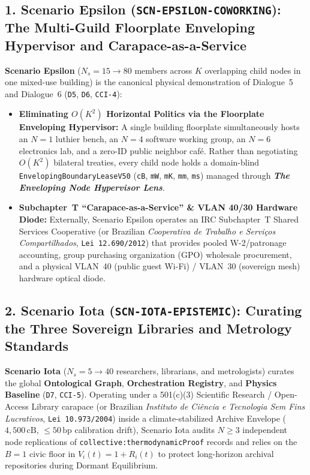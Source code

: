 \subsection{1. Scenario Epsilon (\texttt{SCN-EPSILON-COWORKING}): The Multi-Guild Floorplate Enveloping Hypervisor and Carapace-as-a-Service}
\textbf{Scenario Epsilon} ($N_s = 15 \to 80$ members across $K$ overlapping child nodes in one mixed-use building) is the canonical physical demonstration of Dialogue~5 and Dialogue~6 (\texttt{D5}, \texttt{D6}, \texttt{CCI-4}):
\begin{itemize}
    \item \textbf{Eliminating $O(K^2)$ Horizontal Politics via the Floorplate Enveloping Hypervisor:} A single building floorplate simultaneously hosts an $N=1$ luthier bench, an $N=4$ software working group, an $N=6$ electronics lab, and a zero-ID public neighbor café. Rather than negotiating $O(K^2)$ bilateral treaties, every child node holds a domain-blind \texttt{EnvelopingBoundaryLeaseV50} (\texttt{cB}, \texttt{mW}, \texttt{mK}, \texttt{mm}, \texttt{ms}) managed through \textbf{\textit{The Enveloping Node Hypervisor Lens}}.
    \item \textbf{Subchapter~T ``Carapace-as-a-Service'' \& VLAN 40/30 Hardware Diode:} Externally, Scenario Epsilon operates an IRC Subchapter~T Shared Services Cooperative (or Brazilian \textit{Cooperativa de Trabalho e Serviços Compartilhados}, \texttt{Lei 12.690/2012}) that provides pooled W-2/patronage accounting, group purchasing organization (GPO) wholesale procurement, and a physical VLAN~40 (public guest Wi-Fi) / VLAN~30 (sovereign mesh) hardware optical diode.
\end{itemize}

\subsection{2. Scenario Iota (\texttt{SCN-IOTA-EPISTEMIC}): Curating the Three Sovereign Libraries and Metrology Standards}
\textbf{Scenario Iota} ($N_s = 5 \to 40$ researchers, librarians, and metrologists) curates the global \textbf{Ontological Graph}, \textbf{Orchestration Registry}, and \textbf{Physics Baseline} (\texttt{D7}, \texttt{CCI-5}). Operating under a 501(c)(3) Scientific Research / Open-Access Library carapace (or Brazilian \textit{Instituto de Ci{\^e}ncia e Tecnologia Sem Fins Lucrativos}, \texttt{Lei 10.973/2004}) inside a climate-stabilized Archive Envelope ($4{,}500\,\mathrm{cB}$, $\le 50\,\mathrm{bp}$ calibration drift), Scenario Iota audits $N \ge 3$ independent node replications of \texttt{collective:thermodynamicProof} records and relies on the $B=1$ civic floor in $V_i(t) = 1 + R_i(t)$ to protect long-horizon archival repositories during Dormant Equilibrium.

